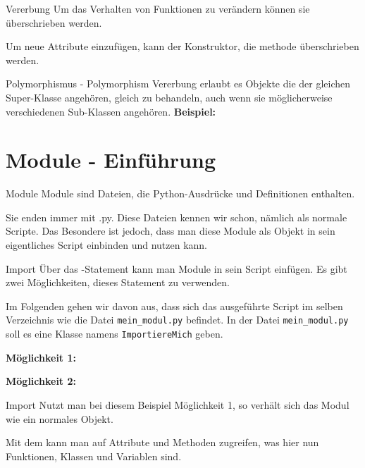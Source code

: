 \begin{frame}{Vererbung}
	Um das Verhalten von Funktionen zu verändern können sie überschrieben werden.
	
	
	Um neue Attribute einzufügen, kann der Konstruktor, die  methode überschrieben werden.
	
\end{frame}

\begin{frame}{Polymorphismus - Polymorphism}
	Vererbung erlaubt es Objekte die der gleichen Super-Klasse angehören, gleich zu behandeln, auch wenn sie möglicherweise verschiedenen Sub-Klassen angehören.\linebreak
	\textbf{Beispiel:}
	
\end{frame}

\section{Module - Einführung}
\begin{frame}{Module}
	Module sind Dateien, die Python-Ausdrücke und Definitionen enthalten. 
	
	Sie enden immer mit \alert{.py}. Diese Dateien kennen wir schon, nämlich als normale Scripte. Das Besondere ist jedoch, dass man diese Module als Objekt in sein eigentliches Script einbinden und nutzen kann.
	
\end{frame}

\begin{frame}{Import}
	Über das -Statement kann man Module in sein Script einfügen. Es gibt zwei Möglichkeiten, dieses Statement zu verwenden.
	
	 Im Folgenden gehen wir davon aus, dass sich das ausgeführte Script im selben Verzeichnis wie die Datei \texttt{mein\_modul.py} befindet. In der Datei \texttt{mein\_modul.py} soll es eine Klasse namens \texttt{ImportiereMich} geben.
	 \pause
	
	\textbf{Möglichkeit 1:}
		
		\pause
	\textbf{Möglichkeit 2:}
		
	
\end{frame}

\begin{frame}{Import}
	Nutzt man bei diesem Beispiel Möglichkeit 1, so verhält sich das Modul wie ein normales Objekt.
	
	Mit dem  kann man auf Attribute und Methoden zugreifen, was hier nun Funktionen, Klassen und Variablen sind.
	
\end{frame}

